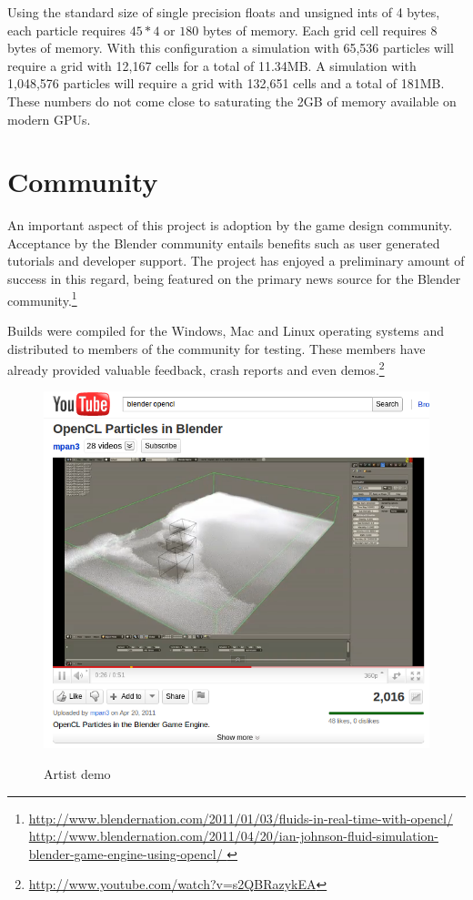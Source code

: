 Using the standard size of single precision floats and unsigned ints of 4
bytes, each particle requires $45*4$ or $180$ bytes of memory. Each grid cell
requires $8$ bytes of memory. With this configuration a simulation with 65,536
particles will require a grid with 12,167 cells for a total of 11.34MB. A
simulation with 1,048,576 particles will require a grid with 132,651 cells and a
total of 181MB. These numbers do not come close to saturating the 2GB of memory
available on modern GPUs.


\section{Community}
An important aspect of this project is adoption by the game design community.
Acceptance by the Blender community entails benefits such as user generated
tutorials and developer support. The project has enjoyed a preliminary amount
of success in this regard, being featured on the primary news source for
the Blender community.\footnote{
\url{http://www.blendernation.com/2011/01/03/fluids-in-real-time-with-opencl/}
\\ 
\url{
http://www.blendernation.com/2011/04/20/ian-johnson-fluid-simulation-blender-game-engine-using-opencl/
} }

Builds were compiled for the Windows, Mac and Linux operating systems and
distributed to members of the community for testing. These members have already
provided valuable feedback, crash reports and even demos.\footnote{ \url{http://www.youtube.com/watch?v=s2QBRazykEA}} 

\begin{figure}[!htc]
 		\centering
		\includegraphics[scale=0.5]{figures/youtube.png}
		\label{fig:logic}
        \caption{ Artist demo }
\end{figure}

